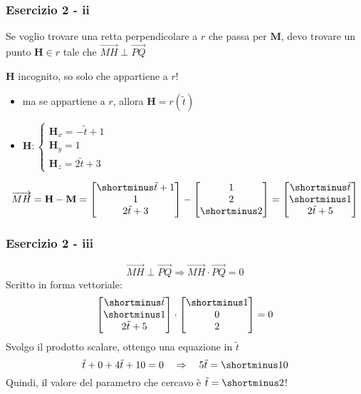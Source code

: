 \documentclass{beamer}
\begin{document}
\begin{frame}
\frametitle{Esercizio 2 - ii}
Se voglio trovare una retta perpendicolare a $r$ che passa per $\mathbf M$, devo trovare un punto
$\mathbf H \in r$ tale che $\overrightarrow{MH} \perp \overrightarrow{PQ}$

\vspace{0.4cm}
    $\mathbf H$ incognito, so solo che appartiene a $r$!
\begin{itemize}
    \item ma se appartiene a $r$, allora $\mathbf H = r(\tilde{t})$
    \item $\mathbf H :\begin{cases} \mathbf H_x = -\tilde t +1\\ \mathbf H_y = 1 \\ \mathbf H_z = 2 \tilde t+3 \end{cases}$
\end{itemize}

\vspace{0.4cm}
$$
\overrightarrow{MH}
    =
    \mathbf H - \mathbf M
    =
    \begin{bmatrix}\shortminus \tilde t + 1\\ 1 \\ 2 \tilde t+3 \end{bmatrix} - \begin{bmatrix}1 \\ 2 \\ \shortminus 2 \end{bmatrix}
    =
    \begin{bmatrix}\shortminus \tilde t \\ \shortminus 1 \\ 2 \tilde t+5 \end{bmatrix}
$$
\end{frame}

\begin{frame}
\frametitle{Esercizio 2 - iii}
\begin{displaymath}
\overrightarrow{MH} \perp \overrightarrow{PQ} 
    \Rightarrow  
\overrightarrow{MH} \cdot \overrightarrow{PQ} = 0  
\end{displaymath}
Scritto in forma vettoriale:
$$
    \begin{bmatrix}\shortminus \tilde t \\ \shortminus 1 \\ 2 \tilde t+5 \end{bmatrix}
        \cdot
    \begin{bmatrix}\shortminus 1 \\ 0 \\ 2 \end{bmatrix} = 0
$$
Svolgo il prodotto scalare, ottengo una equazione in $\tilde t$
$$
    \tilde t + 0 + 4 \tilde t + 10 = 0 \quad \Rightarrow \quad 5 \tilde t = \shortminus 10
$$
    Quindi, il valore del parametro che cercavo \`e $\tilde t = \shortminus 2$!
\end{frame}
\end{document}
